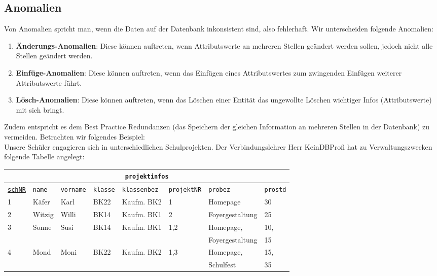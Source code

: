 \subsection[Anomalien]{Anomalien}
Von Anomalien spricht man, wenn die Daten auf der Datenbank inkonsistent sind, also fehlerhaft. Wir unterscheiden folgende Anomalien:\\
\begin{tcolorbox}[title=Anomalien]
	\begin{enumerate}
		\item \textbf{Änderungs-Anomalien}: Diese können auftreten, wenn Attributswerte an mehreren Stellen geändert werden sollen, jedoch nicht alle Stellen geändert werden.
		\item \textbf{Einfüge-Anomalien}: Diese können auftreten, wenn das Einfügen eines Attributswertes zum zwingenden Einfügen weiterer Attributswerte führt.
		\item \textbf{Lösch-Anomalien}: Diese können auftreten, wenn das Löschen einer Entität das ungewollte Löschen wichtiger Infos (Attributswerte) mit sich bringt.
	\end{enumerate}
\end{tcolorbox}
Zudem entspricht es dem Best Practice Redundanzen (das Speichern der gleichen Information an mehreren Stellen in der Datenbank) zu vermeiden. Betrachten wir folgendes Beispiel:\\
Unsere Schüler engagieren sich in unterschiedlichen Schulprojekten. Der Verbindungslehrer Herr KeinDBProfi hat zu Verwaltungszwecken folgende Tabelle angelegt:
\begin{tabular}{llllllll}
	\multicolumn{8}{c}{\lstinline!projektinfos!}\\
	\hline
	\underline{\lstinline!schNR!}&\lstinline!name!&\lstinline!vorname!&\lstinline!klasse!&\lstinline!klassenbez!&\lstinline!projektNR!&\lstinline!probez!&\lstinline!prostd!\\
	\hline
	1 &
	Käfer &
	Karl &
	BK22 &
	Kaufm. BK2&
	1 &
	Homepage &
	30 \\
	2 &
	Witzig  &
	Willi &
	BK14 &
	Kaufm. BK1&
	2 &
	Foyergestaltung &
	25 \\
	3 &
	Sonne &
	Susi &
	BK14 &
	Kaufm. BK1&
	1,2 &
	Homepage,&
	10,\\
	&&&&&&Foyergestaltung&15\\
	4 &
	Mond &
	Moni &
	BK22 &
	Kaufm. BK2 &
	1,3 &
	Homepage,&
	15,  \\
	&&&&&&Schulfest&35\\
\end{tabular}\\
